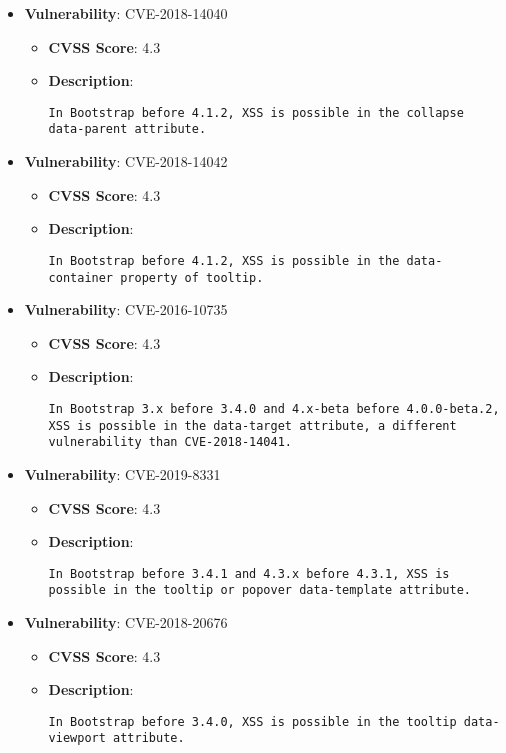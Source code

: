 \documentclass{article}
\begin{document}
\begin{itemize}
    
        \item \textbf{Vulnerability}: CVE-2018-14040
        \begin{itemize}
            \item \textbf{CVSS Score}:  4.3 
            \item \textbf{Description}:
            \parbox[t]{0.9\linewidth}{
                \verb|In Bootstrap before 4.1.2, XSS is possible in the collapse data-parent attribute.|
            }
        \end{itemize}
    
        \item \textbf{Vulnerability}: CVE-2018-14042
        \begin{itemize}
            \item \textbf{CVSS Score}:  4.3 
            \item \textbf{Description}:
            \parbox[t]{0.9\linewidth}{
                \verb|In Bootstrap before 4.1.2, XSS is possible in the data-container property of tooltip.|
            }
        \end{itemize}
    
        \item \textbf{Vulnerability}: CVE-2016-10735
        \begin{itemize}
            \item \textbf{CVSS Score}:  4.3 
            \item \textbf{Description}:
            \parbox[t]{0.9\linewidth}{
                \verb|In Bootstrap 3.x before 3.4.0 and 4.x-beta before 4.0.0-beta.2, XSS is possible in the data-target attribute, a different vulnerability than CVE-2018-14041.|
            }
        \end{itemize}
    
        \item \textbf{Vulnerability}: CVE-2019-8331
        \begin{itemize}
            \item \textbf{CVSS Score}:  4.3 
            \item \textbf{Description}:
            \parbox[t]{0.9\linewidth}{
                \verb|In Bootstrap before 3.4.1 and 4.3.x before 4.3.1, XSS is possible in the tooltip or popover data-template attribute.|
            }
        \end{itemize}
    
        \item \textbf{Vulnerability}: CVE-2018-20676
        \begin{itemize}
            \item \textbf{CVSS Score}:  4.3 
            \item \textbf{Description}:
            \parbox[t]{0.9\linewidth}{
                \verb|In Bootstrap before 3.4.0, XSS is possible in the tooltip data-viewport attribute.|
            }
        \end{itemize}
    

\end{itemize}
\end{document}
